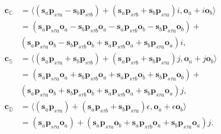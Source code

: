 \documentclass[letterpaper]{article} %
\begin{document}
\begin{equation}
\begin{split}
   \boldsymbol{c}_\mathbb{C} & =  \langle (\boldsymbol{s}_{a} \boldsymbol{p}_{s \tau a} - \boldsymbol{s}_{b} \boldsymbol{p}_{s \tau b}) + (\boldsymbol{s}_{a} \boldsymbol{p}_{s \tau b} + \boldsymbol{s}_{b} \boldsymbol{p}_{s \tau a}) i, \boldsymbol{o}_{a} + i \boldsymbol{o}_{b} \rangle \\
    &= (\boldsymbol{s}_{a} \boldsymbol{p}_{s \tau a} \boldsymbol{o}_{a} - \boldsymbol{s}_{b} \boldsymbol{p}_{s \tau b} \boldsymbol{o}_{a} - \boldsymbol{s}_{a} \boldsymbol{p}_{s \tau b} \boldsymbol{o}_{b} - \boldsymbol{s}_{b} \boldsymbol{p}_{s \tau a} \boldsymbol{o}_{b}) + \\ 
    & (\boldsymbol{s}_{a} \boldsymbol{p}_{s \tau a} \boldsymbol{o}_{b} - \boldsymbol{s}_{b} \boldsymbol{p}_{s \tau b} \boldsymbol{o}_{b} + \boldsymbol{s}_{a} \boldsymbol{p}_{s \tau b} \boldsymbol{o}_{a} + \boldsymbol{s}_{b} \boldsymbol{p}_{s \tau a} \boldsymbol{o}_{a}) i, \\
    \boldsymbol{c}_\mathbb{S} &  = 
    \langle (\boldsymbol{s}_{a} \boldsymbol{p}_{s \tau a} + \boldsymbol{s}_{b} \boldsymbol{p}_{s \tau b}) + (\boldsymbol{s}_{a} \boldsymbol{p}_{s \tau b} + \boldsymbol{s}_{b} \boldsymbol{p}_{s \tau a}) j, \boldsymbol{o}_{a} + j \boldsymbol{o}_{b} \rangle \\
    &= (\boldsymbol{s}_{a} \boldsymbol{p}_{s \tau a} \boldsymbol{o}_{a} + \boldsymbol{s}_{b} \boldsymbol{p}_{s \tau b} \boldsymbol{o}_{a} + \boldsymbol{s}_{a} \boldsymbol{p}_{s \tau b} \boldsymbol{o}_{b} + \boldsymbol{s}_{b} \boldsymbol{p}_{s \tau a} \boldsymbol{o}_{b}) 
    + \\
    &(\boldsymbol{s}_{a} \boldsymbol{p}_{s \tau a} \boldsymbol{o}_{b} + \boldsymbol{s}_{b} \boldsymbol{p}_{s \tau b} \boldsymbol{o}_{b} + \boldsymbol{s}_{a} \boldsymbol{p}_{s \tau b} \boldsymbol{o}_{a} + \boldsymbol{s}_{b} \boldsymbol{p}_{s \tau a} \boldsymbol{o}_{a}) j,\\
         \boldsymbol{c}_\mathbb{D}  & = 
    \langle (\boldsymbol{s}_{a} \boldsymbol{p}_{s \tau a}) + (\boldsymbol{s}_{a} \boldsymbol{p}_{s \tau b} + \boldsymbol{s}_{b} \boldsymbol{p}_{s \tau a}) \epsilon, \boldsymbol{o}_{a} + \epsilon \boldsymbol{o}_{b} \rangle \\
    &= (\boldsymbol{s}_{a} \boldsymbol{p}_{s \tau a} \boldsymbol{o}_{a}) + (\boldsymbol{s}_{a} \boldsymbol{p}_{s \tau a} \boldsymbol{o}_{b} + \boldsymbol{s}_{a} \boldsymbol{p}_{s \tau b} \boldsymbol{o}_{a} + \boldsymbol{s}_{b} \boldsymbol{p}_{s \tau a} \boldsymbol{o}_{a}) j.
\end{split}
\end{equation}
\end{document}
